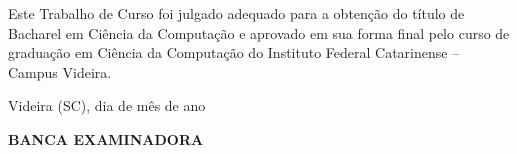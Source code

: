 \begin{folhadeaprovacao}

  \begin{center}
  \vspace*{-1.2cm}
    \textbf{\large\imprimirautor}
    
    \vspace*{\fill}\vspace*{\fill}\vspace*{\fill}
    \parbox{15cm}{
        \OnehalfSpacing\centering\large\textbf{\imprimirtitulo}
    }
    \vspace*{\fill}\vspace*{\fill}
    
    \hspace{.45\textwidth}
    \begin{minipage}{.5\textwidth}
        Este Trabalho de Curso foi julgado
        adequado para a obtenção do título de
        Bacharel em Ciência da Computação e
        aprovado em sua forma final pelo curso de
        graduação em Ciência da Computação do Instituto Federal Catarinense
        – Campus Videira. 

    \end{minipage}%
    \vspace*{\fill}
   \end{center}
    \vspace{-1cm}
  \begin{center}
  	 Videira (SC), dia de mês de ano
  \end{center}
  


  
    \begin{center}
  	\textbf{ BANCA EXAMINADORA}
   \end{center}
    

    \vspace*{1cm}
  
\end{folhadeaprovacao}